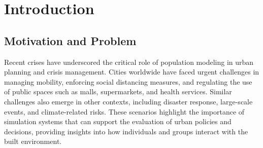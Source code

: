 \documentclass[pdflatex,sn-mathphys-num]{sn-jnl}%
\newcommand\redb[1]{#1}
\theoremstyle{thmstyleone}%
\theoremstyle{thmstyletwo}%
\theoremstyle{thmstylethree}%
\begin{document}
\section{Introduction}
\label{sec:introduction}

\subsection{Motivation and Problem}

Recent crises have underscored the critical role of population modeling in urban planning and crisis management. Cities worldwide have faced urgent challenges in managing mobility, enforcing social distancing measures, and regulating the use of public spaces such as malls, supermarkets, and health services\citep{shafiri2020covidImpact, kang2021hybridCovid, bouchnita2021mathModelCovid}. Similar challenges also emerge in other contexts, including disaster response, large-scale events, and climate-related risks\citep{eid1980, tekouabou2022MLinUrbanPlanning, haraguchi2022mobilityDataReview, serana2023multilevelmodeling}. These scenarios highlight the importance of simulation systems that can \redb{support the evaluation of urban policies and decisions}, providing insights into how individuals and groups interact with the built
environment\citep{kang2021hybridCovid, tekouabou2022MLinUrbanPlanning}.
\end{document}
